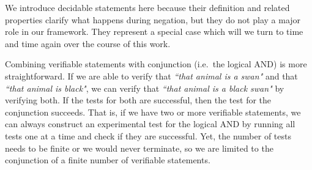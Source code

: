 	We introduce decidable statements here because their definition and related properties clarify what happens during negation, but they do not play a major role in our framework. They represent a special case which will we turn to time and time again over the course of this work.
	
	Combining verifiable statements with conjunction (i.e.~the logical AND) is more straightforward. If we are able to verify that \emph{``that animal is a swan"} and that \emph{``that animal is black"}, we can verify that \emph{``that animal is a black swan"} by verifying both. If the tests for both are successful, then the test for the conjunction succeeds. That is, if we have two or more verifiable statements, we can always construct an experimental test for the logical AND by running all tests one at a time and check if they are successful. Yet, the number of tests needs to be finite or we would never terminate, so we are limited to the conjunction of a finite number of verifiable statements.
	
